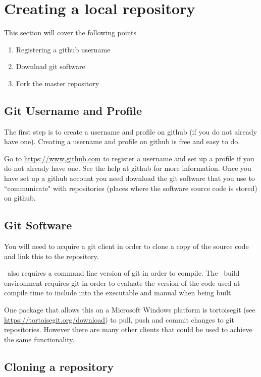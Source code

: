 \section{Creating a local repository\label{sec:local_repo}}

This section will cover the following points

\begin{enumerate}
	\item Registering a github username
	\item Download git software
	\item Fork the master repository
\end{enumerate}

\subsection{Git Username and Profile}

The first step is to create a username and profile on github (if you do not already have one). Creating a username and profile on github is free and easy to do. 

Go to \url{https://www,github.com} to register a username and set up a profile if you do not already have one. See the help at github for more information. Once you have set up a github account you need download the git software that you use to ``communicate" with repositories (places where the software source code is stored) on github.

\subsection{Git Software}

You will need to acquire a git client in order to clone a copy of the source code and link this to the repository.

\CNAME\ also requires a command line version of git in order to compile. The \CNAME\ build environment requires git in order to evaluate the version of the code used at compile time to include into the executable and manual when being built. 

One package that allows this on a Microsoft Windows platform is tortoisegit (see \url{https://tortoisegit.org/download}) to pull, push and commit changes to git repositories. However there are many other clients that could be used to achieve the same functionality.

\subsection{Cloning a repository}


